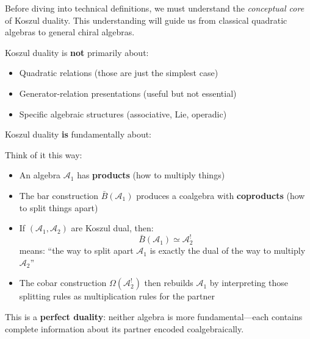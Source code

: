 Before diving into technical definitions, we must understand the \emph{conceptual core} 
of Koszul duality. This understanding will guide us from classical quadratic algebras 
to general chiral algebras.

\begin{principle}
\label{princ:koszul-central-insight}
Koszul duality is \textbf{not} primarily about:
\begin{itemize}
\item Quadratic relations (those are just the simplest case)
\item Generator-relation presentations (useful but not essential)
\item Specific algebraic structures (associative, Lie, operadic)
\end{itemize}

Koszul duality \textbf{is} fundamentally about:
\begin{center}
\end{center}
\end{principle}

\begin{remark}
Think of it this way:
\begin{itemize}
\item An algebra $\mathcal{A}_1$ has \textbf{products} (how to multiply things)
\item The bar construction $\bar{B}(\mathcal{A}_1)$ produces a coalgebra with 
      \textbf{coproducts} (how to split things apart)
\item If $(\mathcal{A}_1, \mathcal{A}_2)$ are Koszul dual, then:
      $$\bar{B}(\mathcal{A}_1) \simeq \mathcal{A}_2^!$$
      means: ``the way to split apart $\mathcal{A}_1$ is exactly the dual of 
      the way to multiply $\mathcal{A}_2$''
\item The cobar construction $\Omega(\mathcal{A}_2^!)$ then rebuilds $\mathcal{A}_1$ 
      by interpreting those splitting rules as multiplication rules for the partner
\end{itemize}

This is a \textbf{perfect duality}: neither algebra is more fundamental—each contains 
complete information about its partner encoded coalgebraically.
\end{remark}

